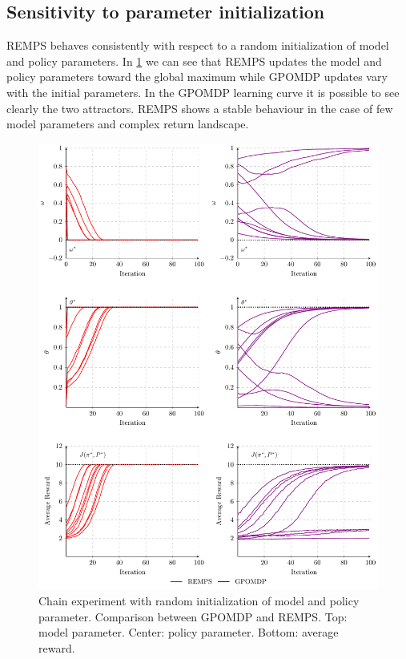 \subsection{Sensitivity to parameter initialization}
REMPS behaves consistently with respect to a random initialization of model and policy parameters. In \cref{fig:chain-random-init} we can see that REMPS updates the model and policy parameters toward the global maximum while GPOMDP updates vary with the initial parameters. In the GPOMDP learning curve it is possible to see clearly the two attractors. REMPS shows a stable behaviour in the case of few model parameters and complex return landscape. 
\begin{figure}[!tb]
\centering
	\includegraphics[width=1\textwidth]{plots/chain/plot_random_init}
	\caption{Chain experiment with random initialization of model and policy parameter. Comparison between GPOMDP and REMPS. Top: model parameter. Center: policy parameter. Bottom: average reward.}
	\label{fig:chain-random-init}
\end{figure}
